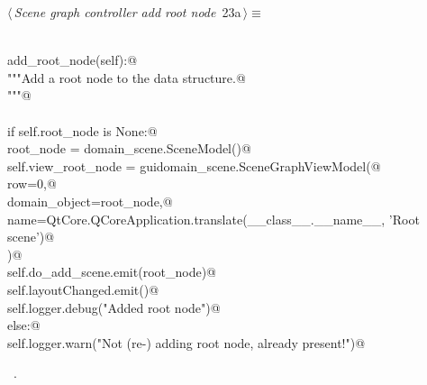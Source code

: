 \documentclass[
    a4paper,      %
    10pt,         %
    openright,    %
    notitlepage,  %
    parskip=half, %
]{scrreprt}       %
\theoremstyle{definition}                    %
\begin{document}
\begin{flushleft} \small
\begin{minipage}{\linewidth}\label{scrap18}\raggedright\small
{} $\langle\,${\itshape Scene graph controller add root node}\nobreak\ {\footnotesize {23a}}$\,\rangle\equiv$
\vspace{-1ex}
\begin{list}{}{} \item
\mbox{}\lstinline@@\\
\mbox{}\lstinline@def add_root_node(self):@\\
\mbox{}\lstinline@    """Add a root node to the data structure.@\\
\mbox{}\lstinline@    """@\\
\mbox{}\lstinline@@\\
\mbox{}\lstinline@    if self.root_node is None:@\\
\mbox{}\lstinline@        root_node = domain_scene.SceneModel()@\\
\mbox{}\lstinline@        self.view_root_node = guidomain_scene.SceneGraphViewModel(@\\
\mbox{}\lstinline@            row=0,@\\
\mbox{}\lstinline@            domain_object=root_node,@\\
\mbox{}\lstinline@            name=QtCore.QCoreApplication.translate(__class__.__name__, 'Root scene')@\\
\mbox{}\lstinline@        )@\\
\mbox{}\lstinline@        self.do_add_scene.emit(root_node)@\\
\mbox{}\lstinline@        self.layoutChanged.emit()@\\
\mbox{}\lstinline@        self.logger.debug("Added root node")@\\
\mbox{}\lstinline@    else:@\\
\mbox{}\lstinline@        self.logger.warn("Not (re-) adding root node, already present!")@\\
\mbox{}\lstinline@@{\NWsep}
\end{list}
\vspace{-1.5ex}
\footnotesize
\begin{list}{}{\setlength{\itemsep}{-\parsep}\setlength{\itemindent}{-\leftmargin}}
\item \NWtxtMacroRefIn\ .

\item{}
\end{list}
\end{minipage}\vspace{4ex}
\end{flushleft}
\end{document}
